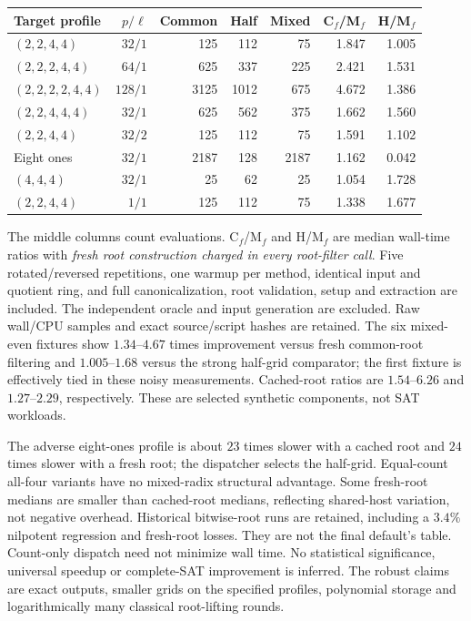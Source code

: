 \documentclass[11pt,letterpaper]{article}
\theoremstyle{remark}\newtheorem{remark}[theorem]{Remark}
\begin{document}
\begin{center}\small
\begin{tabular}{@{}lrrrrrr@{}}
\toprule
Target profile & $p/\ell$ & Common & Half & Mixed & C$_f$/M$_f$ & H/M$_f$\\\midrule
$(2,2,4,4)$ & $32/1$ &125&112&75&1.847&1.005\\
$(2,2,2,4,4)$ & $64/1$ &625&337&225&2.421&1.531\\
$(2,2,2,2,4,4)$ & $128/1$ &3125&1012&675&4.672&1.386\\
$(2,2,4,4,4)$ & $32/1$ &625&562&375&1.662&1.560\\
$(2,2,4,4)$ & $32/2$ &125&112&75&1.591&1.102\\
Eight ones & $32/1$ &2187&128&2187&1.162&0.042\\
$(4,4,4)$ & $32/1$ &25&62&25&1.054&1.728\\
$(2,2,4,4)$ & $1/1$ &125&112&75&1.338&1.677\\
\bottomrule
\end{tabular}
\end{center}
The middle columns count evaluations. C$_f$/M$_f$ and H/M$_f$ are median
wall-time ratios with \emph{fresh root construction charged in every
root-filter call}. Five rotated/reversed repetitions, one warmup per method,
identical input and quotient ring, and full canonicalization, root validation,
setup and extraction are included. The independent oracle and input generation
are excluded. Raw wall/CPU samples and exact source/script hashes are retained.
The six mixed-even fixtures show $1.34$--$4.67$ times improvement versus
fresh common-root filtering and $1.005$--$1.68$ versus the strong half-grid
comparator; the first fixture is effectively tied in these noisy measurements.
Cached-root ratios are $1.54$--$6.26$ and $1.27$--$2.29$, respectively.
These are selected synthetic components, not SAT workloads.

The adverse eight-ones profile is about $23$ times slower with a cached root
and $24$ times slower with a fresh root; the dispatcher selects the half-grid.
Equal-count all-four variants have no mixed-radix structural advantage.
Some fresh-root medians are smaller than cached-root medians, reflecting
shared-host variation, not negative overhead. Historical bitwise-root runs
are retained, including a $3.4\%$ nilpotent regression and fresh-root losses.
They are not the final default's table. Count-only dispatch need not minimize
wall time. No statistical significance, universal speedup or complete-SAT
improvement is inferred. The robust claims are exact outputs, smaller grids
on the specified profiles, polynomial storage and logarithmically many
classical root-lifting rounds.
\end{document}
